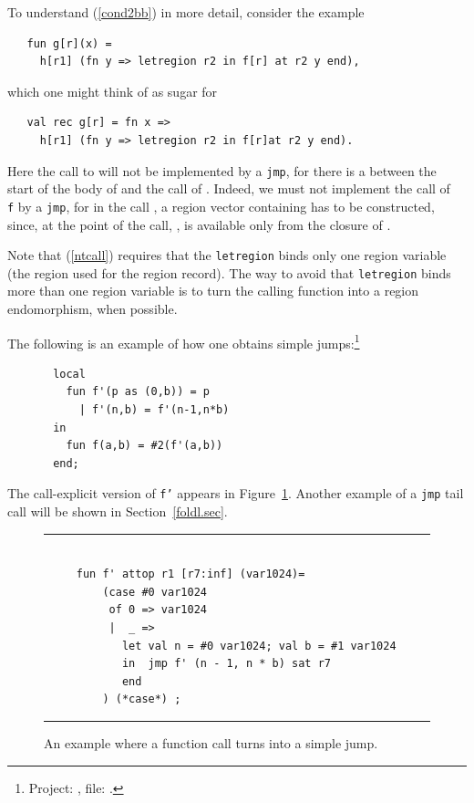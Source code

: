 \documentclass[12pt]{book}
\begin{document}
To understand (\ref{cond2bb}) in more detail, consider the example
\begin{verbatim}
   fun g[r](x) = 
     h[r1] (fn y => letregion r2 in f[r] at r2 y end),
\end{verbatim}
which one might think of as sugar for 
\begin{verbatim}
   val rec g[r] = fn x => 
     h[r1] (fn y => letregion r2 in f[r]at r2 y end).
\end{verbatim}
Here the call to  will not be implemented by a {\tt jmp}, for
there is a  between the start of the body of  and
the call of .  Indeed, we must not implement the call of {\tt
f} by a {\tt jmp}, for in the call ,  
a region vector containing  has to be constructed, since,
at the point of the call, , is available only from the closure
of .


Note that (\ref{ntcall}) requires 
that the {\tt letregion} binds only one region variable (the region used for
the region record). The way to avoid that {\tt letregion} binds more than one region variable 
is to turn the calling function into a region endomorphism, when possible.

The following is an example of how one obtains simple jumps:\footnote{Project: , file: .}
\begin{verbatim}
       local
         fun f'(p as (0,b)) = p
           | f'(n,b) = f'(n-1,n*b)
       in
         fun f(a,b) = #2(f'(a,b))
       end;
\end{verbatim}
The  call-explicit version of {\tt f'} appears in 
Figure~\ref{tail2.fig}. 
Another example of a {\tt jmp} tail call 
will be shown in Section~\ref{foldl.sec}.

\begin{figure}
\hrule
\begin{verbatim}

     fun f' attop r1 [r7:inf] (var1024)= 
         (case #0 var1024 
          of 0 => var1024
          |  _ => 
            let val n = #0 var1024; val b = #1 var1024
            in  jmp f' (n - 1, n * b) sat r7
            end 
         ) (*case*) ; 
\end{verbatim}
\caption{An example where a function call 
         turns into a simple jump.}
\medskip
\hrule
\label{tail2.fig}
\end{figure}
\end{document}
